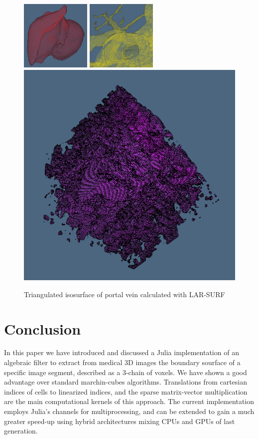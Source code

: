 \documentclass[11pt, oneside]{amsart}   	%
\begin{document}
\begin{figure}
\centering
\includegraphics[width=0.3\textwidth]{figs/liver_01_red_3.png} 
\vspace{0.05\textwidth}
\includegraphics[width=0.3\textwidth]{figs/portalvein_01_yellow_3.png} 
\vspace{0.05\textwidth}
\includegraphics[height=0.3\textwidth]{figs/nrn10_100_low_res.png} 
\caption{Triangulated isosurface of portal vein calculated with LAR-SURF}
\label{fig:example_ircad}
\end{figure}



%
\section{Conclusion}\label{sec:conclusion}

In this paper we have introduced and discussed a Julia implementation of an algebraic filter to extract from medical 3D images the boundary sourface of a specific image segment, described as a 3-chain of voxels. We have shown a good advantage over standard marchin-cubes algorithms. Translations from cartesian indices of cells to linearized indices, and the sparse matrix-vector multiplication are the main computational kernels of this approach. The current implementation employs Julia's channels for multiprocessing, and can be extended to gain a much greater speed-up using hybrid architectures mixing  CPUs and GPUs of last generation. 
\end{document}
